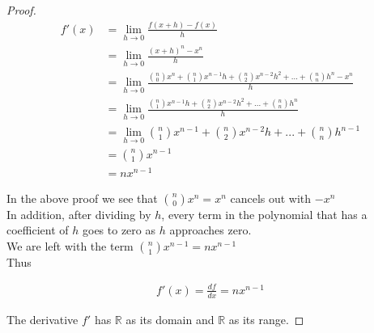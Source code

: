 \documentclass{article}
\begin{document}
\begin{proof}
\begin{align*}
f'(x) &= \lim_{h \to 0} \frac{\displaystyle f(x+h) - f(x)}{\displaystyle h} \\
&= \lim_{h \to 0} \frac{\displaystyle (x+h)^n - x^n}{\displaystyle h} \\
&= \lim_{h \to 0} \frac{\displaystyle \binom{n}{0} x^{n} + \binom{n}{1} x^{n-1} h + \binom{n}{2} x^{n-2} h^2 + ... + \binom{n}{n} h^n - x^n}{\displaystyle h} \\
&= \lim_{h \to 0} \frac{\displaystyle \binom{n}{1} x^{n-1} h + \binom{n}{2} x^{n-2} h^2 + ... + \binom{n}{n} h^n}{\displaystyle h} \\
&= \lim_{h \to 0} \binom{n}{1} x^{n-1} + \binom{n}{2} x^{n-2} h + ... + \binom{n}{n} h^{n-1} \\
&= \binom{n}{1} x^{n-1} \\
&= nx^{n-1}
\end{align*}

In the above proof we see that $\displaystyle \binom{n}{0} x^{n} = x^{n}$ cancels out with $-x^{n}$ \\

In addition, after dividing by $h$, every term in the polynomial that has a coefficient of $h$ goes to zero as $h$ approaches zero. \\

We are left with the term $\displaystyle \binom{n}{1} x^{n-1} = nx^{n-1}$ \\

Thus 

\begin{align*}
f'(x) = \frac{df}{dx} = nx^{n-1}
\end{align*}

The derivative $f'$ has $\mathbb{R}$ as its domain and $\mathbb{R}$ as its range.

\end{proof}
\end{document}
